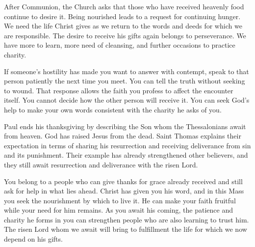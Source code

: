 After Communion, the Church asks that those who have received heavenly food continue to desire it. Being nourished leads to a request for continuing hunger. We need the life Christ gives as we return to the words and deeds for which we are responsible. The desire to receive his gifts again belongs to perseverance. We have more to learn, more need of cleansing, and further occasions to practice charity.

If someone's hostility has made you want to answer with contempt, speak to that person patiently the next time you meet. You can tell the truth without seeking to wound. That response allows the faith you profess to affect the encounter itself. You cannot decide how the other person will receive it. You can seek God's help to make your own words consistent with the charity he asks of you.

Paul ends his thanksgiving by describing the Son whom the Thessalonians await from heaven. God has raised Jesus from the dead. Saint Thomas explains their expectation in terms of sharing his resurrection and receiving deliverance from sin and its punishment. Their example has already strengthened other believers, and they still await resurrection and deliverance with the risen Lord.

You belong to a people who can give thanks for grace already received and still ask for help in what lies ahead. Christ has given you his word, and in this Mass you seek the nourishment by which to live it. He can make your faith fruitful while your need for him remains. As you await his coming, the patience and charity he forms in you can strengthen people who are also learning to trust him. The risen Lord whom we await will bring to fulfillment the life for which we now depend on his gifts.
